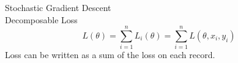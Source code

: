 \documentclass[aspectratio=169]{../latex_main/tntbeamer}  %
\begin{document}
	
	
	\begin{frame}{Stochastic Gradient Descent}
    	\vspace{0cm}
	    \hspace{4cm}\\
	   Decomposable Loss
       \begin{equation*}
           L(\theta)  = \sum\limits_{i=1}^nL_i(\theta) = \sum\limits_{i=1}^nL(\theta, x_i, y_i)
       \end{equation*}
       Loss can be written as a sum of the loss on each record.
	\end{frame}
	
	
	
\end{document}
